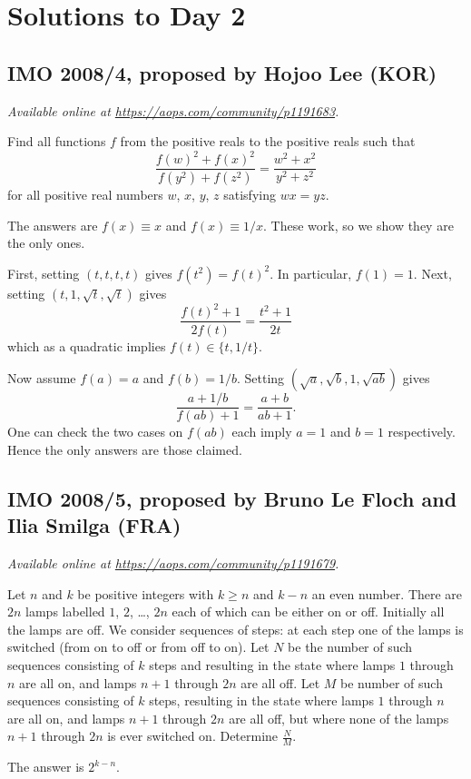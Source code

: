 \documentclass[11pt]{scrartcl}
\begin{document}
\section{Solutions to Day 2}
\subsection{IMO 2008/4, proposed by Hojoo Lee (KOR)}
\textsl{Available online at \url{https://aops.com/community/p1191683}.}
\begin{mdframed}[style=mdpurplebox,frametitle={Problem statement}]
Find all functions $f$ from the positive reals to the positive reals such that
\[ \frac{f(w)^2 + f(x)^2}{f(y^2)+f(z^2)} = \frac{w^2+x^2}{y^2+z^2} \]
for all positive real numbers $w$, $x$, $y$, $z$ satisfying $wx=yz$.
\end{mdframed}
The answers are $f(x) \equiv x$ and $f(x) \equiv 1/x$.
These work, so we show they are the only ones.

First, setting $(t,t,t,t)$ gives $f(t^2) = f(t)^2$.
In particular, $f(1) = 1$.
Next, setting $(t, 1, \sqrt t, \sqrt t)$ gives
\[ \frac{f(t)^2 + 1}{2f(t)} = \frac{t^2 + 1}{2t} \]
which as a quadratic implies $f(t) \in \{t, 1/t\}$.

Now assume $f(a) = a$ and $f(b) = 1/b$.
Setting $(\sqrt a, \sqrt b, 1, \sqrt{ab})$ gives
\[ \frac{a + 1/b}{f(ab) + 1} = \frac{a+b}{ab+1}. \]
One can check the two cases on $f(ab)$ each imply
$a=1$ and $b=1$ respectively.
Hence the only answers are those claimed.
\pagebreak

\subsection{IMO 2008/5, proposed by Bruno Le Floch and Ilia Smilga (FRA)}
\textsl{Available online at \url{https://aops.com/community/p1191679}.}
\begin{mdframed}[style=mdpurplebox,frametitle={Problem statement}]
Let $n$ and $k$ be positive integers with $k \geq n$ and $k - n$ an even number.
There are $2n$ lamps labelled $1$, $2$, \dots, $2n$ each of which can be either on or off.
Initially all the lamps are off.
We consider sequences of steps: at each step one of the lamps is switched
(from on to off or from off to on).
Let $N$ be the number of such sequences consisting of $k$ steps
and resulting in the state where lamps $1$ through $n$ are all on,
and lamps $n + 1$ through $2n$ are all off.
Let $M$ be number of such sequences consisting of $k$ steps,
resulting in the state where lamps $1$ through $n$ are all on,
and lamps $n + 1$ through $2n$ are all off,
but where none of the lamps $n + 1$ through $2n$ is ever switched on.
Determine $\frac{N}{M}$.
\end{mdframed}
The answer is $2^{k-n}$.
\end{document}
